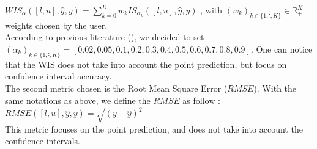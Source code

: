 $WIS_\alpha( [l, u], \hat{y}, y ) = \sum_{k=0}^{K} w_k IS_{\alpha_k}( [l, u], \hat{y}, y ) $ , with $(w_k)_{k \in \{1, \vdots , K\}} \in \mathbb{R}_+ ^K $ weights chosen by the user. \\

According to previous literature (\cite{cramer2022evaluation}), we decided to set $(\alpha_k)_{k \in \{1, \vdots , K\}} = [0.02, 0.05, 0.1, 0.2, 0.3, 0.4, 0.5, 0.6, 0.7, 0.8, 0.9]$. 
One can notice that the WIS does not take into account the point prediction, but focus on confidence interval accuracy. \\

The second metric chosen is the Root Mean Square Error ($RMSE$). 
With the same notations as above, we define the $RMSE$ as follow : \\
$RMSE([l, u], \hat{y}, y) = \sqrt{(y-\hat{y})^2}$\\
This metric focuses on the point prediction, and does not take into account the confidence intervals. 





